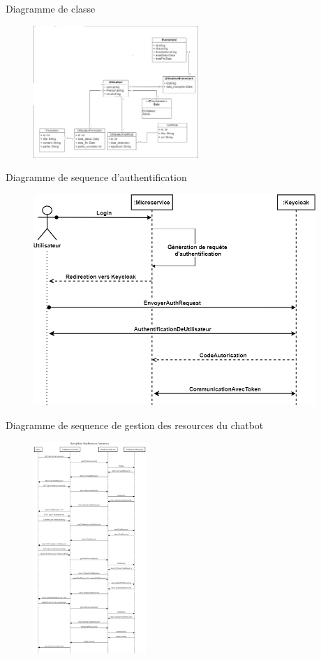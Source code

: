 \documentclass[aspectratio=169]{beamer}
\begin{document}
\begin{frame}{Diagramme de classe}

    \begin{figure}[htpb]
        \centering
        \includegraphics[height=5cm]{assets/images/sprint2-class.png}
    \end{figure}
\end{frame}

\begin{frame}{Diagramme de sequence d'authentification}
    \begin{figure}[htpb]
        \centering
        \includegraphics[height=8cm]{assets/images/keycloak-seq.png}
    \end{figure}
\end{frame}

\begin{frame}{Diagramme de sequence de gestion des resources du chatbot}
    \begin{figure}[htpb]
        \centering
        \includegraphics[height=8cm]{assets/images/chat-res-seq.png}
    \end{figure}
\end{frame}
\end{document}
